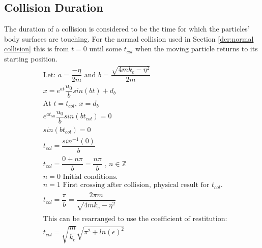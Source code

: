 \documentclass[a4paper,11pt,titlepage]{report}
\begin{document}
\subsection{Collision Duration}
\label{der:collision duration}
The duration of a collision is considered to be the time for which the particles' body surfaces are touching. For the normal collision used in Section \ref{der:normal collision} this is from $t = 0$ until some $t_{col}$ when the moving particle returns to its starting position.
\begin{align*}
&\text{Let: } a = \dfrac{-\eta}{2m} \text{ and } b = \dfrac{\sqrt{4mk_e - \eta ^ 2}}{2m} \\
&x = e^{at} \dfrac{u_0}{b} sin(bt) + d_b \\
&\text{At $t = t_{col}$, $x = d_b$} \\
&e^{a t_{col}} \dfrac{u_0}{b} sin(b t_{col}) = 0 \\
&sin(bt_{col}) = 0 \\
&t_{col} = \dfrac{sin^{-1}(0)}{b} \\
&t_{col} = \dfrac{0 + n \pi}{b} = \dfrac{n \pi}{b} \text{ , } n \in \mathbb{Z} \\
&n = 0 \text{ Initial conditions.} \\
&n = 1 \text{ First crossing after collision, physical result for $t_{col}$.} \\
&t_{col} = \dfrac{\pi}{b} = \dfrac{2 \pi m}{\sqrt{4 m k_e - \eta ^ 2}} \\\\
&\text{This can be rearranged to use the coefficient of restitution:} \\
&t_{col} = \sqrt{\dfrac{m}{k_e}}\sqrt{\pi^2 + ln(\epsilon)^2}
\end{align*}
\end{document}
